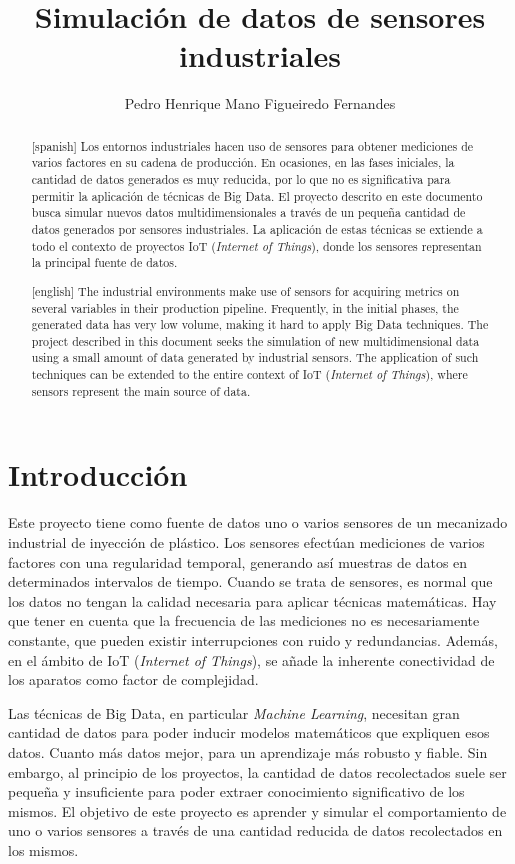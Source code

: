 \documentclass[11pt,spanish,listoffigures,listoftables]{tfgetsinf}
\title{Simulación de datos de sensores industriales}
\author{Pedro Henrique Mano Figueiredo Fernandes}
\begin{document}
\begin{abstract}[spanish]
Los entornos industriales hacen uso de sensores para obtener mediciones de varios factores en su cadena de producción. En ocasiones, en las fases iniciales, la cantidad de datos generados es muy reducida, por lo que no es significativa para permitir la aplicación de técnicas de Big Data. El proyecto descrito en este documento busca simular nuevos datos multidimensionales a través de un pequeña cantidad de datos generados por sensores industriales. La aplicación de estas técnicas se extiende a todo el contexto de proyectos IoT ({\em Internet of Things}), donde los sensores representan la principal fuente de datos. 
\end{abstract}

\begin{abstract}[english]
The industrial environments make use of sensors for acquiring metrics on several variables in their production pipeline. Frequently, in the initial phases, the generated data has very low volume, making it hard to apply Big Data techniques. The project described in this document seeks the simulation of new multidimensional data using a small amount of data generated by industrial sensors. The application of such techniques can be extended to the entire context of IoT ({\em Internet of Things}), where sensors represent the main source of data.
\end{abstract}


\mainmatter


\chapter{Introducción}
Este proyecto tiene como fuente de datos uno o varios sensores de un mecanizado industrial de inyección de plástico. Los sensores efectúan mediciones de varios factores con una regularidad temporal, generando así muestras de datos en determinados intervalos de tiempo. Cuando se trata de sensores, es normal que los datos no tengan la calidad necesaria para aplicar técnicas matemáticas. Hay que tener en cuenta que la frecuencia de las mediciones no es necesariamente constante, que pueden existir interrupciones con ruido y redundancias. Además, en el ámbito de IoT ({\em Internet of Things}), se añade la inherente conectividad de los aparatos como factor de complejidad.

Las técnicas de Big Data, en particular {\em Machine Learning}, necesitan gran cantidad de datos para poder inducir modelos matemáticos que expliquen esos datos. Cuanto más datos mejor, para un aprendizaje más robusto y fiable. Sin embargo, al principio de los proyectos, la cantidad de datos recolectados suele ser pequeña y insuficiente para poder extraer conocimiento significativo de los mismos. El objetivo de este proyecto es aprender y simular el comportamiento de uno o varios sensores a través de una cantidad reducida de datos recolectados en los mismos. 
\end{document}
